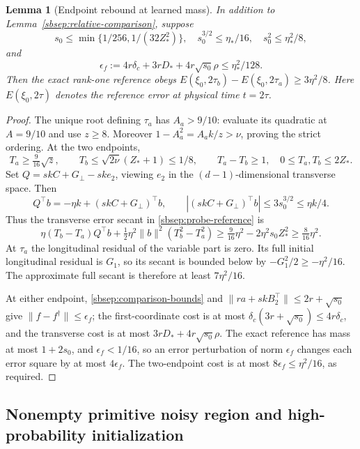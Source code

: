 \documentclass{article} %
\theoremstyle{plain}
\newtheorem{lemma}[theorem]{Lemma}
\theoremstyle{definition}
\theoremstyle{remark}
\begin{document}
\begin{lemma}[Endpoint rebound at learned mass]
\label{sbsep:reference-rebound}
In addition to Lemma~\ref{sbsep:relative-comparison}, suppose
\begin{equation}\label{sbsep:rebound-caps}
 s_0\le\min\{1/256,1/(32Z_*^2)\},\quad
 s_0^{3/2}\le\eta_*/16,\quad s_0^2\le\eta_*^2/8,
\end{equation}
and
\begin{equation}\label{sbsep:output-cap}
 \epsilon_f:=4r\delta_c+3rD_*+4r\sqrt{s_0}\rho
 \le\eta_*^2/128.
\end{equation}
Then the exact rank-one reference obeys
$E(\xi_0,2\tau_b)-E(\xi_0,2\tau_a)\ge3\eta^2/8$.
Here $E(\xi_0,2\tau)$ denotes the reference error at physical time
$t=2\tau$.
\end{lemma}
\begin{proof}
The unique root defining $\tau_a$ has $A_a>9/10$: evaluate its quadratic
at $A=9/10$ and use $z\ge8$. Moreover
$1-A_a^2=A_ak/z>\nu$, proving the strict ordering.
At the two endpoints,
\[
 T_a\ge\tfrac9{16}\sqrt z,\qquad
 T_b\le\sqrt{2\nu}(Z_*+1)\le1/8,
 \qquad T_a-T_b\ge1,\quad 0\le T_a,T_b\le2Z_*.
\]
Set $Q=skC+G_\perp-sk e_2$, viewing $e_2$ in the $(d-1)$-dimensional
transverse space. Then
\[
 Q^\top b=-\eta k+(skC+G_\perp)^\top b,
 \qquad |(skC+G_\perp)^\top b|\le3s_0^{3/2}\le\eta k/4.
\]
Thus the transverse error secant in \eqref{sbsep:probe-reference} is
\[
 \eta(T_b-T_a)Q^\top b+
 \tfrac12\eta^2\|b\|^2(T_b^2-T_a^2)
 \ge\tfrac9{16}\eta^2-2\eta^2s_0Z_*^2
 \ge\tfrac8{16}\eta^2.
\]
At $\tau_a$ the longitudinal residual of the variable part is zero.
Its full initial longitudinal residual is $G_1$, so its secant is
bounded below by $-G_1^2/2\ge-\eta^2/16$.
The approximate full secant is therefore at least $7\eta^2/16$.

At either endpoint, \eqref{sbsep:comparison-bounds} and
$\|ra+skB_2^\top\|\le2r+\sqrt{s_0}$ give
$\|f-f^\dagger\|\le\epsilon_f$; the first-coordinate cost is at most
$\delta_c(3r+\sqrt{s_0})\le4r\delta_c$, and the transverse cost is
at most $3rD_*+4r\sqrt{s_0}\rho$.
The exact reference has mass at most $1+2s_0$, and $\epsilon_f<1/16$,
so an error perturbation of norm $\epsilon_f$ changes each error square
by at most $4\epsilon_f$. The two-endpoint cost is at most
$8\epsilon_f\le\eta^2/16$, as required.
\end{proof}

\subsection{Nonempty primitive noisy region and high-probability initialization}
\end{document}

